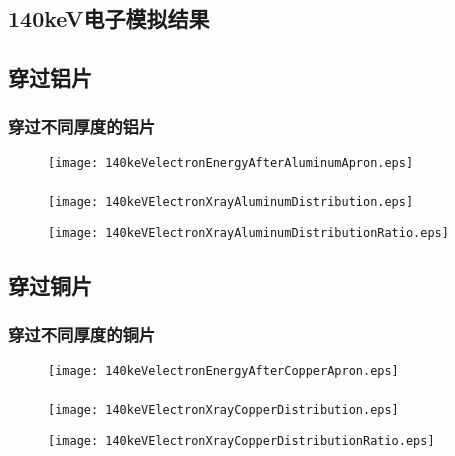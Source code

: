 \documentclass{beamer}
\begin{document}
\begin{CJK*}{UTF8}{gkai}
  \section{140keV电子模拟结果}
  \subsection{穿过铝片}
  \begin{frame}\frametitle{穿过不同厚度的铝片}
    \begin{figure}[ht]
      \texttt{[image: 140keVelectronEnergyAfterAluminumApron.eps]}
    \end{figure}
  \end{frame}
  \begin{frame}\frametitle{}
    \begin{figure}[ht]
      \texttt{[image: 140keVElectronXrayAluminumDistribution.eps]}

      \texttt{[image: 140keVElectronXrayAluminumDistributionRatio.eps]}
    \end{figure}
  \end{frame}
  \subsection{穿过铜片}
  \begin{frame}\frametitle{穿过不同厚度的铜片}
    \begin{figure}[ht]
      \texttt{[image: 140keVelectronEnergyAfterCopperApron.eps]}
    \end{figure}
  \end{frame}
  \begin{frame}\frametitle{}
    \begin{figure}[ht]
      \texttt{[image: 140keVElectronXrayCopperDistribution.eps]}

      \texttt{[image: 140keVElectronXrayCopperDistributionRatio.eps]}
    \end{figure}
  \end{frame}



\end{CJK*}
\end{document}
